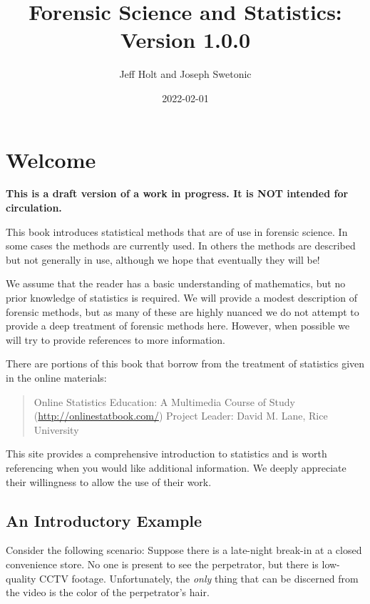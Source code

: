 \documentclass[
]{book}
\title{Forensic Science and Statistics: Version 1.0.0}
\author{Jeff Holt and Joseph Swetonic}
\date{2022-02-01}
\begin{document}
\maketitle

{
\setcounter{tocdepth}{1}
\tableofcontents
}
\hypertarget{welcome}{%
\chapter{Welcome}\label{welcome}}

\textbf{This is a draft version of a work in progress. It is NOT intended for circulation.}

This book introduces statistical methods that are of use in forensic science.
In some cases the methods are currently used.
In others the methods are described but not generally in use,
although we hope that eventually they will be!

We assume that the reader has a basic understanding of mathematics, but no prior
knowledge of statistics is required.
We will provide a modest description of forensic methods, but as many of these are
highly nuanced we do not attempt to
provide a deep treatment of forensic methods here. However, when possible we will
try to provide references to more information.

There are portions of this book that borrow from the treatment of statistics
given in the online materials:

\begin{quote}
Online Statistics Education: A Multimedia Course of Study (\url{http://onlinestatbook.com/})
Project Leader: David M. Lane, Rice University
\end{quote}

This site provides a comprehensive introduction to statistics and is worth referencing when you would like additional information.
We deeply appreciate their willingness to allow the use of their work.

\hypertarget{an-introductory-example}{%
\section{An Introductory Example}\label{an-introductory-example}}

Consider the following scenario:
Suppose there is a late-night break-in at a closed convenience store.
No one is present to see the perpetrator, but there is low-quality CCTV footage.
Unfortunately, the \emph{only} thing that can be discerned from the video is the
color of the perpetrator's hair.
\end{document}
